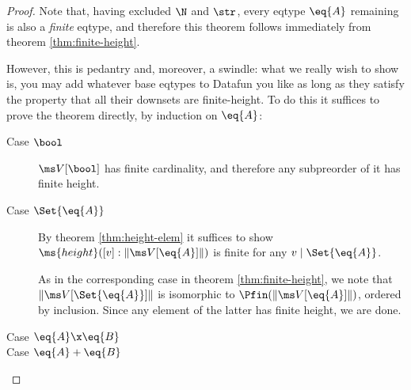 \documentclass{article}
\newcommand{\widevec}[1]{\overrightarrow{#1}}
\newcommand{\eqposet}[1]{\ms{Eq}(#1)}
\renewcommand{\eqposet}[1]{\|{#1}\|}
\newcommand{\eqclass}[1]{[#1]}
\newcommand{\height}{\ms{height}}
\newcommand{\elemheight}[2]{\height(#2 : #1)}
\newcommand{\down}[2]{\mathop{\downarrow}(#2 : #1)}
\newcommand{\lr}[2]{#2\mathrel{|}#1}
\begin{document}
\begin{proof}
  Note that, having excluded $\N$ and $\str$, every eqtype $\eq{A}$ remaining is
  also a \emph{finite} eqtype, and therefore this theorem follows immediately
  from theorem \ref{thm:finite-height}.

  However, this is pedantry and, moreover, a swindle: what we really wish to
  show is, you may add whatever base eqtypes to Datafun you like as long as they
  satisfy the property that all their downsets are finite-height. To do this it
  suffices to prove the theorem directly, by induction on $\eq{A}$:
  \begin{description}
  \item[Case $\bool$] $\Val{\bool}$ has finite cardinality, and therefore any
    subpreorder of it has finite height.


  \item[Case $\Set{\eq{A}}$] By theorem \ref{thm:height-elem} it suffices to
    show $\elemheight{\eqposet{\Val{\eq{A}}}}{\eqclass{v}}$ is finite for any
    $\lr{\Set{\eq{A}}}{v}$.

    As in the corresponding case in theorem \ref{thm:finite-height}, we note
    that $\eqposet{\Val{\Set{\eq{A}}}}$ is isomorphic to
    $\Pfin(\eqposet{\Val{\eq{A}}})$, ordered by inclusion. Since any element of
    the latter has finite height, we are done.



  \item[Case $\eq{A} \x \eq{B}$] \TODO
  \item[Case $\eq{A} + \eq{B}$] \TODO
  \end{description}
\end{proof}
\end{document}
